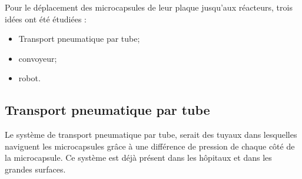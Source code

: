 Pour le déplacement des \glspl{microcapsule} de leur plaque jusqu'aux réacteurs, trois idées ont été étudiées : 
\begin{itemize}
    \item Transport pneumatique par tube;
    \item convoyeur;
    \item robot.
\end{itemize}
\subsection*{Transport pneumatique par tube}
Le système de transport pneumatique par tube, serait des tuyaux dans lesquelles naviguent les \glspl{microcapsule} grâce à une différence de pression de chaque côté de la \gls{microcapsule}. Ce système est déjà présent dans les hôpitaux et dans les grandes surfaces.
